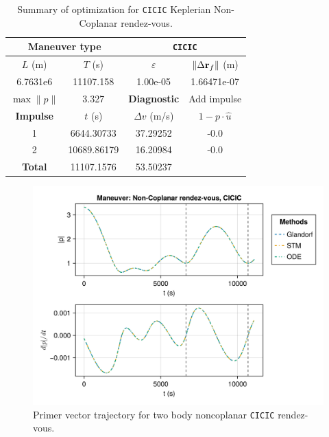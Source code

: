 \begin{table}[htpb]
    \centering
    \begin{tabular}{cccc} \toprule
    \multicolumn{2}{c}{\textbf{Maneuver type}} & \multicolumn{2}{c}{\texttt{CICIC}} \\ \midrule
    \(L\) (m) & \(T\) (s) & \(\varepsilon\) & \(\lVert \Delta \mathbf{r}_{f} \rVert\) (m)    \\ \midrule
    6.7631e6          & 11107.158          & 1.00e-05                & 1.66471e-07                        \\ \midrule
    \(\max \lVert p \rVert\) & 3.327     & \textbf{Diagnostic}   & Add impulse        \\ \midrule
    \textbf{Impulse} & \(t\) (s) & \(\Delta v\) (m/s) & \(1 - p \cdot \hat{u}\) \\ \midrule
    1                 & 6644.30733          & 37.29252             & -0.0                    \\
    2                 & 10689.86179          & 16.20984             & -0.0                    \\\midrule
    \textbf{Total}   & 11107.1576          & 53.50237             &                     \\ \bottomrule   
    \end{tabular}
    \caption{Summary of optimization for \texttt{CICIC} Keplerian Non-Coplanar rendez-vous.}
    \label{tab:tb_nr_CICIC_tab}
\end{table}

\begin{figure}[htbp]
    \centering
    \includegraphics[width=\linewidth]{../results/two_body/ipv_noncop/CICIC_primer_vector.png}
    \caption{Primer vector trajectory for two body noncoplanar \texttt{CICIC} rendez-vous.}
    \label{fig:tb_ncop_CICIC_pv}
\end{figure}


